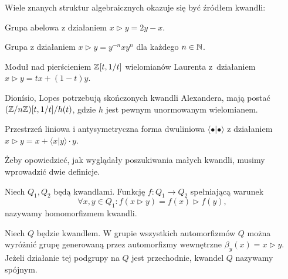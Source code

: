 Wiele znanych struktur algebraicznych okazuje się być źródłem kwandli:

\begin{example}
%
%
    Grupa abelowa z działaniem $x \triangleright y = 2y - x$.
\end{example}

\begin{example}
%
    Grupa z działaniem $x \triangleright y = y^{-n} x y^n$ dla każdego $n \in \mathbb N$.
\end{example}

\begin{example}
%
    Moduł nad pierścieniem $\mathbb Z[t, 1/t]$ wielomianów Laurenta z~działaniem $x \triangleright y = tx + (1-t) y$.
\end{example}

Dionísio, Lopes \cite[s. 1043]{lopes03} potrzebują skończonych kwandli Alexandera, mają postać $(\mathbb Z/n\mathbb Z)[t, 1/t] / h(t)$, gdzie $h$ jest pewnym unormowanym wielomianem.

\begin{example}
%
    Przestrzeń liniowa i antysymetryczna forma dwuliniowa $\langle \bullet | \bullet \rangle$ z działaniem $x \triangleright y = x + \langle x | y \rangle \cdot y$.
\end{example}

Żeby opowiedzieć, jak wyglądały poszukiwania małych kwandli, musimy wprowadzić dwie definicje.

\begin{definition}
    Niech $Q_1, Q_2$ będą kwandlami.
    Funkcję $f \colon Q_1 \to Q_2$ spełniającą warunek
    \begin{equation}
        \forall x, y \in Q_1 : f(x \triangleright y) = f(x) \triangleright f(y),
    \end{equation}
    nazywamy homomorfizmem kwandli.
\end{definition}

\begin{definition}
%
    Niech $Q$ będzie kwandlem.
    W grupie wszystkich automorfizmów $Q$ można wyróżnić grupę generowaną przez automorfizmy wewnętrzne $\beta_y(x) = x \triangleright y$.
    Jeżeli działanie tej podgrupy na $Q$ jest przechodnie, kwandel $Q$ nazywamy spójnym.
\end{definition}

